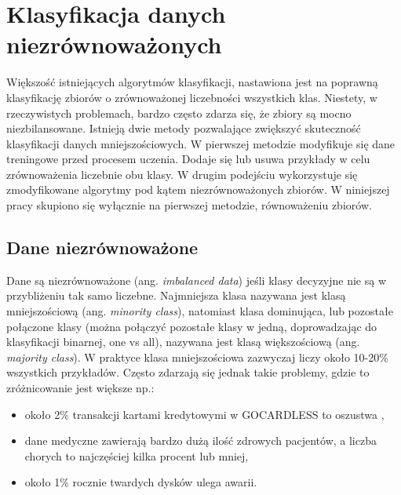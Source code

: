 \chapter{Klasyfikacja danych niezrównoważonych}
Większość istniejących algorytmów klasyfikacji, nastawiona jest na poprawną klasyfikację zbiorów o zrównoważonej liczebności wszystkich klas. Niestety, w rzeczywistych problemach, bardzo często zdarza się, że zbiory są mocno niezbilansowane. Istnieją dwie metody pozwalające zwiększyć skuteczność klasyfikacji danych mniejszościowych. W pierwszej metodzie modyfikuje się dane treningowe przed procesem uczenia. Dodaje się lub usuwa przykłady w celu zrównoważenia liczebnie obu klasy. W drugim podejściu wykorzystuje się zmodyfikowane algorytmy pod kątem niezrównoważonych zbiorów. W niniejszej pracy skupiono się wyłącznie na pierwszej metodzie, równoważeniu zbiorów.	
\section{Dane niezrównoważone}
Dane są niezrównoważone (ang. \textit{imbalanced data}) jeśli klasy decyzyjne nie są w przybliżeniu tak samo liczebne. Najmniejsza klasa nazywana jest klasą mniejszościową (ang. \textit{minority class}), natomiast klasa dominująca, lub pozostałe połączone klasy (można połączyć pozostałe klasy w jedną, doprowadzając do klasyfikacji binarnej, one vs all), nazywana jest klasą większościową (ang. \textit{majority class}). W praktyce klasa mniejszościowa zazwyczaj liczy około 10-20\% wszystkich przykładów. Często zdarzają się jednak takie problemy, gdzie to zróżnicowanie jest większe np.:
\begin{itemize}
	\item około 2\% transakcji kartami kredytowymi w GOCARDLESS to oszustwa \cite{gocardless},
	\item dane medyczne zawierają bardzo dużą ilość zdrowych pacjentów, a liczba chorych to najczęściej kilka procent lub mniej,
	\item około 1\% rocznie twardych dysków ulega awarii.
	
\end{itemize}

